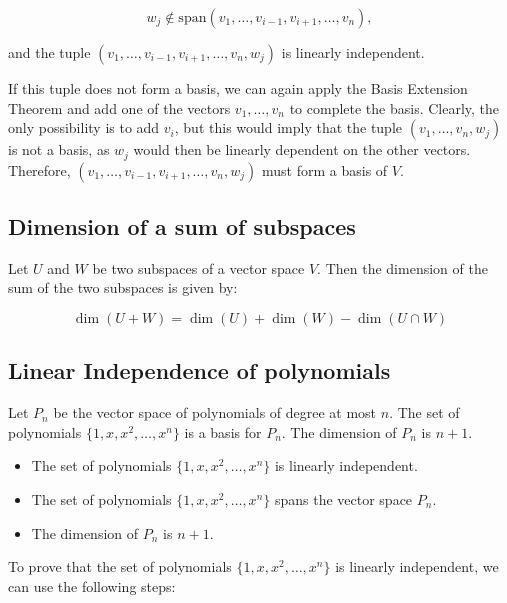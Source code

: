 \[
	w_j \notin \text{span}(v_1, \ldots, v_{i-1}, v_{i+1}, \ldots, v_n),
\]

and the tuple \((v_1, \ldots, v_{i-1}, v_{i+1}, \ldots, v_n, w_j)\) is linearly independent.

If this tuple does not form a basis, we can again apply the Basis Extension Theorem 
and add one of the vectors \(v_1, \ldots, v_n\) to complete the basis. Clearly, the only possibility is 
to add \(v_i\), but this would imply that the tuple \((v_1, \ldots, v_n, w_j)\) is not a basis, as 
\(w_j\) would then be linearly dependent on the other vectors. 
Therefore, \((v_1, \ldots, v_{i-1}, v_{i+1}, \ldots, v_n, w_j)\) must form a basis of \(V\).

\QED

\subsection{Dimension of a sum of subspaces}

Let \(U\) and \(W\) be two subspaces of a vector space \(V\). Then the dimension of the sum of the two 
subspaces is given by:

\[
    \dim(U + W) = \dim(U) + \dim(W) - \dim(U \cap W)    
\]

\subsection{Linear Independence of polynomials}

Let \(P_n\) be the vector space of polynomials of degree at most \(n\). The set of polynomials 
\(\{1, x, x^2, \ldots, x^n\}\) is a basis for \(P_n\).
The dimension of \(P_n\) is \(n + 1\).

\begin{itemize}

	\item The set of polynomials \(\{1, x, x^2, \ldots, x^n\}\) is linearly independent.

	\item The set of polynomials \(\{1, x, x^2, \ldots, x^n\}\) spans the vector space \(P_n\).

	\item The dimension of \(P_n\) is \(n + 1\).

\end{itemize}

To prove that the set of polynomials \(\{1, x, x^2, \ldots, x^n\}\) is linearly independent, 
we can use the following steps:

